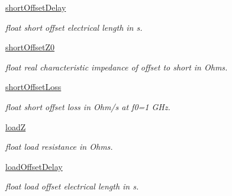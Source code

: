 \begin{DoxyCompactItemize}
\hyperlink{classSignalIntegrity_1_1Measurement_1_1CalKit_1_1CalibrationKit_1_1CalibrationConstants_a3788f4ba32f719747647f27057b09358}{short\+Offset\+Delay}
\begin{DoxyCompactList}\small\item\em float short offset electrical length in s. \end{DoxyCompactList}\item 
\mbox{\label{classSignalIntegrity_1_1Measurement_1_1CalKit_1_1CalibrationKit_1_1CalibrationConstants_a29e1fe2c574523008fef1af4d3ac9965}} 
\hyperlink{classSignalIntegrity_1_1Measurement_1_1CalKit_1_1CalibrationKit_1_1CalibrationConstants_a29e1fe2c574523008fef1af4d3ac9965}{short\+Offset\+Z0}
\begin{DoxyCompactList}\small\item\em float real characteristic impedance of offset to short in Ohms. \end{DoxyCompactList}\item 
\hyperlink{classSignalIntegrity_1_1Measurement_1_1CalKit_1_1CalibrationKit_1_1CalibrationConstants_a5bf0570ae171a60bee53e8585136c5ef}{short\+Offset\+Loss}
\begin{DoxyCompactList}\small\item\em float short offset loss in Ohm/s at f0=1 G\+Hz. \end{DoxyCompactList}\item 
\mbox{\label{classSignalIntegrity_1_1Measurement_1_1CalKit_1_1CalibrationKit_1_1CalibrationConstants_adbeb4c00961abecebd43b114375e3d2e}} 
\hyperlink{classSignalIntegrity_1_1Measurement_1_1CalKit_1_1CalibrationKit_1_1CalibrationConstants_adbeb4c00961abecebd43b114375e3d2e}{loadZ}
\begin{DoxyCompactList}\small\item\em float load resistance in Ohms. \end{DoxyCompactList}\item 
\hyperlink{classSignalIntegrity_1_1Measurement_1_1CalKit_1_1CalibrationKit_1_1CalibrationConstants_a1575a38ec854a962cdeaaad407a403c0}{load\+Offset\+Delay}
\begin{DoxyCompactList}\small\item\em float load offset electrical length in s. \end{DoxyCompactList}\item 

\end{DoxyCompactItemize}
